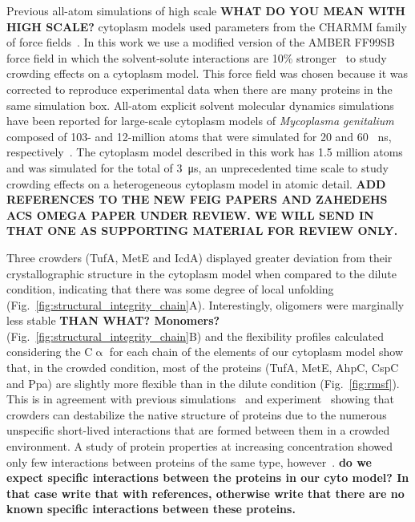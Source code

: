 \documentclass[journal=jcisd8,manuscript=article]{achemso}
\begin{document}
Previous
all-atom simulations of high scale {\bf WHAT DO YOU MEAN WITH HIGH
  SCALE?} cytoplasm models used parameters from the CHARMM family of
force fields~\cite{Yu2016a}. In this work we use a modified version of
the AMBER FF99SB force field in which the solvent-solute interactions
are 10\% stronger~\cite{Best2014a} to study crowding effects on a
cytoplasm model. This force field was chosen because it was corrected
to reproduce experimental data when there are many proteins in the
same simulation box. All-atom explicit solvent molecular dynamics
simulations have been reported for large-scale cytoplasm models of
\textit{Mycoplasma genitalium} composed of 103- and 12-million atoms
that were simulated for 20 and 60 \SI{}{\nano\second},
respectively~\cite{Yu2016a}. The cytoplasm model described in this
work has 1.5 million atoms and was simulated for the total of
\SI{3}{\micro\second}, an unprecedented time scale to study crowding
effects on a heterogeneous cytoplasm model in atomic detail.  {\bf ADD
  REFERENCES TO THE NEW FEIG PAPERS AND ZAHEDEHS ACS OMEGA PAPER UNDER
  REVIEW. WE WILL SEND IN THAT ONE AS SUPPORTING MATERIAL FOR REVIEW
  ONLY.}

Three crowders (TufA, MetE and IcdA) displayed greater deviation from
their crystallographic structure in the cytoplasm model when compared
to the dilute condition, indicating that there was some degree of
local unfolding
(Fig.~\ref{fig:structural_integrity_chain}A). Interestingly, oligomers
were marginally less stable {\bf THAN WHAT? Monomers?}
(Fig.~\ref{fig:structural_integrity_chain}B) and the flexibility
profiles calculated considering the C$\upalpha$ for each chain of the
elements of our cytoplasm model show that, in the crowded condition,
most of the proteins (TufA, MetE, AhpC, CspC and Ppa) are slightly
more flexible than in the dilute condition (Fig.~\ref{fig:rmsf}). This
is in agreement with previous simulations~\cite{Feig2011} and
experiment~\cite{miklos2011,Wang2012b} showing that crowders can
destabilize the native structure of proteins due to the numerous
unspecific short-lived interactions that are formed between them in a
crowded environment. A study of protein properties at increasing
concentration showed only few interactions between proteins of the
same type, however~\cite{Bashardanesh2019a}. {\bf do we expect specific interactions between the proteins in our cyto model? In that case write that with references, otherwise write that there are no known specific interactions between these proteins.}
\end{document}
